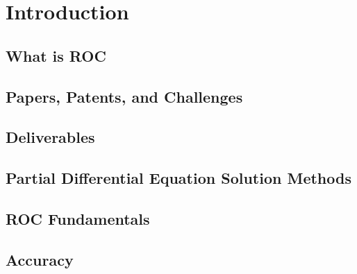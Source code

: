 \chapter{Introduction}

\section{What is ROC}\label{whatROC}


\section{Papers, Patents, and Challenges}


\section{Deliverables}


\section{Partial Differential Equation Solution Methods}


\section{ROC Fundamentals}


\section{Accuracy}



